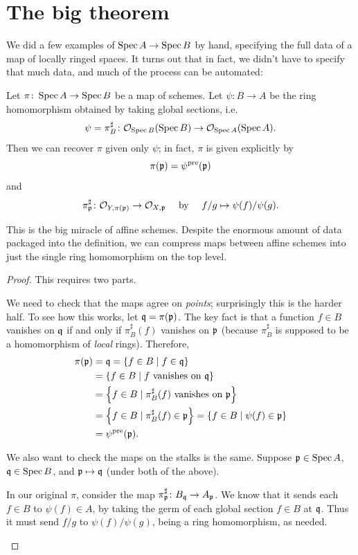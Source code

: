 \section{The big theorem}
We did a few examples of $\operatorname{Spec} A \to \operatorname{Spec} B$ by hand,
specifying the full data of a map of locally ringed spaces.
It turns out that in fact, we didn't have to specify that much data,
and much of the process can be automated:
\begin{proposition}
	\label{prop:affine_reconstruction}
	Let $\pi \colon \operatorname{Spec} A \to \operatorname{Spec} B$ be a map of schemes.
	Let $\psi \colon B \to A$ be the ring homomorphism
	obtained by taking global sections, i.e.
	\[ \psi= \pi^\sharp_B \colon \mathcal O_{\operatorname{Spec} B}(\operatorname{Spec} B)
		\to \mathcal O_{\operatorname{Spec} A}(\operatorname{Spec} A). \]
	Then we can recover $\pi$ given only $\psi$;
	in fact, $\pi$ is given explicitly by
	\[ \pi(\mathfrak p) = \psi^{\text{pre}}(\mathfrak p) \]
	and
	\[ \pi^\sharp_\mathfrak p \colon \mathcal O_{Y,\pi(\mathfrak p)} \to \mathcal O_{X,\mathfrak p}
			\quad\text{ by }\quad f/g \mapsto \psi(f)/\psi(g).  \]
\end{proposition}
This is the big miracle of affine schemes.
Despite the enormous amount of data packaged into the definition,
we can compress maps between affine schemes
into just the single ring homomorphism on the top level.
\begin{proof}
	This requires two parts.
	\begin{itemize}
		\ii We need to check that the maps agree on \emph{points};
		surprisingly this is the harder half.
		To see how this works, let $\mathfrak q = \pi(\mathfrak p)$.
		The key fact is that a function $f \in B$ vanishes on $\mathfrak q$
		if and only if $\pi^\sharp_B(f)$ vanishes on $\mathfrak p$
		(because $\pi^\sharp_B$ is supposed to be a
		homomorphism of \emph{local} rings).
		Therefore,
		\begin{align*}
			\pi(\mathfrak p) &= \mathfrak q = \left\{ f \in B \mid f \in \mathfrak q \right\} \\
			&= \left\{ f \in B \mid f \text{ vanishes on } \mathfrak q \right\} \\
			&= \left\{ f \in B \mid \pi^\sharp_B(f) \text{ vanishes on } \mathfrak p \right\} \\
			&= \left\{ f \in B \mid \pi^\sharp_B(f) \in \mathfrak p \right\}
			= \left\{ f \in B \mid \psi(f) \in \mathfrak p \right\} \\
			&= \psi^{\text{pre}}(\mathfrak p).
		\end{align*}

		\ii We also want to check the maps on the stalks is the same.
		Suppose $\mathfrak p \in \operatorname{Spec} A$, $\mathfrak q \in \operatorname{Spec} B$,
		and $\mathfrak p \mapsto \mathfrak q$ (under both of the above).

		In our original $\pi$, consider the map
		$\pi^\sharp_\mathfrak p \colon B_\mathfrak q \to A_\mathfrak p$.
		We know that it sends each $f \in B$ to $\psi(f) \in A$,
		by taking the germ of each global section $f \in B$ at $\mathfrak q$.
		Thus it must send $f/g$ to $\psi(f) / \psi(g)$,
		being a ring homomorphism, as needed. \qedhere
	\end{itemize}
\end{proof}

